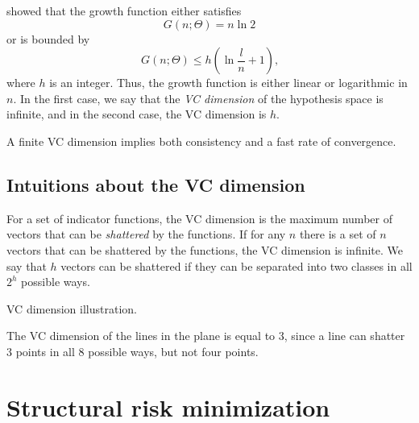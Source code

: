 \citeauthor{Vapnik1968} showed that the growth function either
satisfies
\[
  G(n; \Theta) = n \ln 2
\]
or is bounded by
\[
  G(n; \Theta) \leq h \left( \ln \frac{l}{n} + 1 \right)\text{,}
\]
where $h$ is an integer.  Thus, the growth function is either linear or logarithmic in
$n$.  In the first case, we say that the \emph{VC dimension} of the hypothesis space is
infinite, and in the second case, the VC dimension is $h$.

A finite VC dimension implies both consistency and a fast rate of convergence.

\subsection{Intuitions about the VC dimension}

For a set of indicator functions, the VC dimension is the maximum number of vectors that
can be \emph{shattered} by the functions.  If for any $n$ there is a set of $n$
vectors that can be shattered by the functions, the VC dimension is infinite.
We say that $h$ vectors can be shattered if they can be separated into two classes in all
$2^h$ possible ways.

\begin{figurebox}[label=fig:vc-dimension]{VC dimension illustration.}
  \centering
  \tcblower
  The VC dimension of the lines in the plane is equal to 3, since a line can shatter 3
  points in all 8 possible ways, but not four points.
\end{figurebox}


\section{Structural risk minimization}

